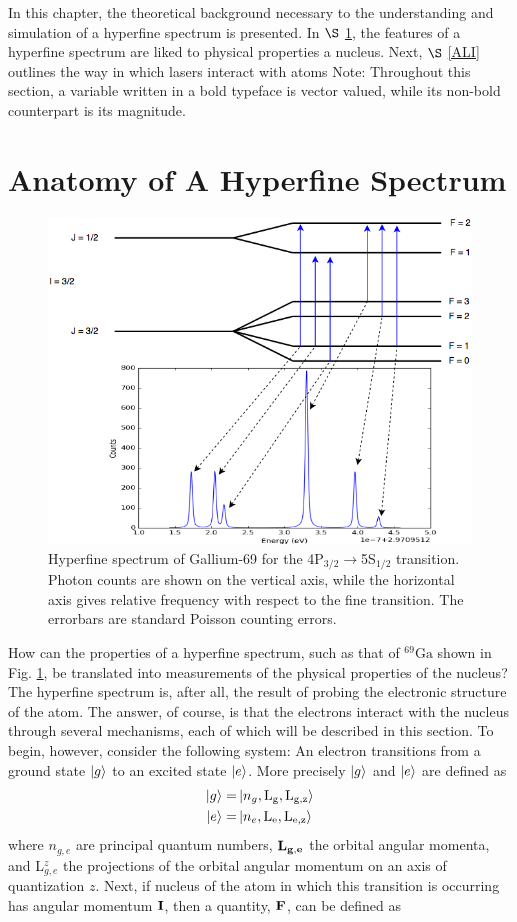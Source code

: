 In this chapter, the theoretical background necessary to the understanding and simulation of a hyperfine spectrum is presented. In $\S$ \ref{AHF}, the features of a hyperfine spectrum are liked to physical properties a nucleus. Next, $\S$ \ref{ALI} outlines the way in which lasers interact with atoms
Note: Throughout this section, a variable written in a bold typeface is vector valued, while its non-bold counterpart is its magnitude. 
\section{Anatomy of A Hyperfine Spectrum}
\label{AHF}
\begin{figure}[h]
\includegraphics[width=\textwidth]{Graphics/spec_with_peaks.png}
\caption{Hyperfine spectrum of Gallium-69 for the 4P$_{3/2}\rightarrow$5S$_{1/2}$ transition. Photon counts are shown on the vertical axis, while the horizontal axis gives relative frequency with respect to the fine transition. The errorbars are standard Poisson counting errors.}
\label{ga69}
\end{figure}
How can the properties of a hyperfine spectrum, such as that of $^{69}\mathrm{Ga}$ shown in Fig. \ref{ga69}, be translated into measurements of the physical properties of the nucleus? The hyperfine spectrum is, after all, the result of probing the electronic structure of the atom. The answer, of course, is that the electrons interact with the nucleus through several mechanisms, each of which will be described in this section. To begin, however, consider the following system: An electron transitions from a ground state $\ket{g}$ to an excited state $\ket{e}$. More precisely $\ket{g}$ and $\ket{e}$ are defined as 
\begin{align}
\ket{g} =& \ket{n_g,\mathrm{L_g,L_{g,z}}}\\
\ket{e} =& \ket{n_e,\mathrm{L_e,L_{e,z}}}
\end{align}
where $n_{g,e}$ are principal quantum numbers, $\bf{L_{g,e}}$ the orbital angular momenta, and L$_{g,e}^z$ the projections of the orbital angular momentum on an axis of quantization $z$. Next, if nucleus of the atom in which this transition is occurring has angular momentum $\bf{I}$, then a quantity, $\bf{F}$, can be defined as 

